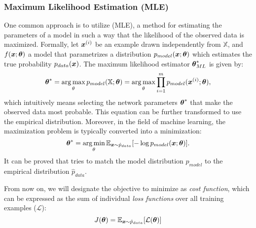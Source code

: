 \subsubsection{Maximum Likelihood Estimation (MLE)}
One common approach is to utilize  (MLE), a method for estimating the parameters of a model in such a way that the likelihood of the observed data is maximized. Formally, let $\boldsymbol{x}^{(i)}$ be an example drawn independently from $\mathbb{X}$, and $f(\boldsymbol{x};\boldsymbol{\theta})$ a model that parametrizes a distribution $p_{model}(\boldsymbol{x};\boldsymbol{\theta})$ which estimates the true probability $p_{data}(\boldsymbol{x})$. The maximum likelihood estimator $\boldsymbol{\theta}^*_{ML}$ is given by:
\begin{equation}
    \boldsymbol{\theta}^* = \operatorname*{arg\,max}_\theta p_{model}(\mathbb{X};\boldsymbol{\theta}) = \operatorname*{arg\,max}_\theta \prod_{i=1}^m p_{model}(\boldsymbol{x}^{(i)};\boldsymbol{\theta}),
\end{equation}
which intuitively means selecting the network parameters $\boldsymbol{\theta}^*$ that make the observed data most probable. This equation can be further transformed to use the empirical distribution. Moreover, in the field of machine learning, the maximization problem is typically converted into a minimization:
\begin{equation}
    \boldsymbol{\theta}^* = \operatorname*{arg\,min}_\theta \mathbb{E}_{\boldsymbol{x}\sim \hat{p}_{data}} [- \log p_{model}(\boldsymbol{x};\boldsymbol{\theta})].
    \label{eq:mle}
\end{equation}
It can be proved that  tries to match the model distribution $p_{model}$ to the empirical distribution $\hat{p}_{data}$. 

From now on, we will designate the objective to minimize as \textit{cost function}, which can be expressed as the sum of individual \textit{loss functions} over all training examples ($\mathcal{L}$):
\begin{equation}
    J(\boldsymbol{\theta}) = \mathbb{E}_{\boldsymbol{x}\sim \hat{p}_{data}} [\mathcal{L}(\boldsymbol{\theta})]
\end{equation}

